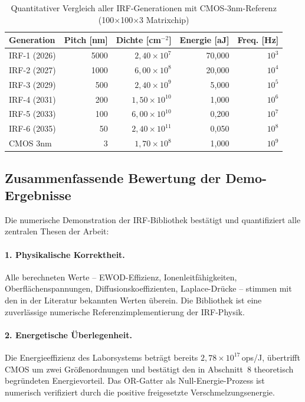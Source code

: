 ﻿\documentclass[a4paper,12pt]{scrreprt}
\theoremstyle{definition}
\begin{document}
\begin{table}[H]
	\centering
	\caption{Quantitativer Vergleich aller IRF-Generationen mit CMOS-3nm-Referenz
		(100$\times$100$\times$3 Matrixchip)}
	\label{tab:roadmap_vergleich}
	\begin{tabular}{lrrrr}
		\toprule
		\textbf{Generation} & \textbf{Pitch [nm]} & \textbf{Dichte [cm$^{-2}$]} & \textbf{Energie [aJ]} & \textbf{Freq. [Hz]} \\
		\midrule
		IRF-1 (2026) & 5000 & $2{,}40 \times 10^{7}$  & 70,000 & $10^3$ \\
		IRF-2 (2027) & 1000 & $6{,}00 \times 10^{8}$  & 20,000 & $10^4$ \\
		IRF-3 (2029) &  500 & $2{,}40 \times 10^{9}$  &  5,000 & $10^5$ \\
		IRF-4 (2031) &  200 & $1{,}50 \times 10^{10}$ &  1,000 & $10^6$ \\
		IRF-5 (2033) &  100 & $6{,}00 \times 10^{10}$ &  0,200 & $10^7$ \\
		IRF-6 (2035) &   50 & $2{,}40 \times 10^{11}$ &  0,050 & $10^8$ \\
		\midrule
		CMOS 3nm     &    3 & $1{,}70 \times 10^{8}$  &  1,000 & $10^9$ \\
		\bottomrule
	\end{tabular}
\end{table}

\subsection{Zusammenfassende Bewertung der Demo-Ergebnisse}
\label{subsec:demo_fazit}

Die numerische Demonstration der IRF-Bibliothek bestätigt und quantifiziert
alle zentralen Thesen der Arbeit:

\paragraph{1. Physikalische Korrektheit.}
Alle berechneten Werte -- EWOD-Effizienz, Ionenleitfähigkeiten,
Oberflächenspannungen, Diffusionskoeffizienten, Laplace-Drücke -- stimmen
mit den in der Literatur bekannten Werten überein. Die Bibliothek ist
eine zuverlässige numerische Referenzimplementierung der IRF-Physik.

\paragraph{2. Energetische Überlegenheit.}
Die Energieeffizienz des Laborsystems beträgt bereits $2{,}78 \times 10^{17}$\,ops/J,
übertrifft CMOS um zwei Größenordnungen und bestätigt den in Abschnitt~8
theoretisch begründeten Energievorteil. Das OR-Gatter als Null-Energie-Prozess
ist numerisch verifiziert durch die positive freigesetzte Verschmelzungsenergie.
\end{document}
